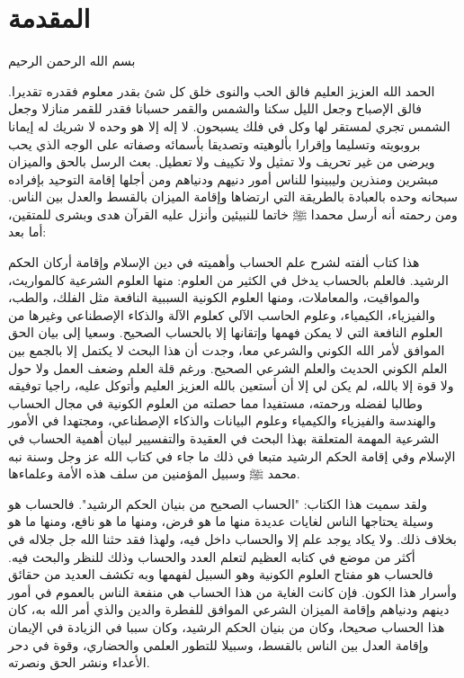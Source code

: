 \chapter*{المقدمة}

\begin{center}
    بسم الله الرحمن الرحيم
\end{center}

الحمد الله العزيز العليم فالق الحب والنوى خلق كل شئ بقدر معلوم فقدره تقديرا. فالق الإصباح وجعل الليل سكنا والشمس والقمر حسبانا فقدر للقمر منازلا وجعل الشمس تجري لمستقر لها وكل في فلك يسبحون. لا إله إلا هو وحده لا شريك له  إيمانا بروبويته وتسليما وإقرارا بألوهيته وتصديقا بأسمائه وصفاته على الوجه الذي يحب ويرضى من غير تحريف ولا تمثيل ولا تكييف ولا تعطيل. بعث الرسل بالحق والميزان مبشرين ومنذرين وليبينوا للناس أمور دنيهم ودنياهم ومن أجلها إقامة التوحيد بإفراده سبحانه وحده بالعبادة بالطريقة التي ارتضاها وإقامة الميزان بالقسط والعدل بين الناس. ومن رحمته أنه أرسل محمدا ﷺ خاتما للنبيئين وأنزل عليه القرآن هدى وبشرى للمتقين، أما بعد:

هذا كتاب ألفته لشرح علم الحساب وأهميته في دين الإسلام وإقامة أركان الحكم الرشيد. فالعلم بالحساب يدخل في الكثير من العلوم: منها العلوم الشرعية كالمواريث، والمواقيت، والمعاملات، ومنها العلوم الكونية السببية النافعة مثل الفلك، والطب، والفيزياء، الكيمياء، وعلوم الحاسب الآلي كعلوم الآلة والذكاء الإصطناعي وغيرها من العلوم النافعة التي لا يمكن فهمها وإتقانها إلا بالحساب الصحيح. وسعيا إلى بيان الحق الموافق لأمر الله الكوني والشرعي معا، وجدت أن هذا البحث لا يكتمل إلا بالجمع بين العلم الكوني الحديث والعلم الشرعي الصحيح. ورغم قلة العلم وضعف العمل ولا حول ولا قوة إلا بالله، لم يكن لي إلا أن أستعين بالله العزيز العليم وأتوكل عليه، راجيا توفيقه وطالبا لفضله ورحمته، مستفيدا مما حصلته من العلوم الكونية في مجال الحساب والهندسة والفيزياء والكيمياء وعلوم البيانات والذكاء الإصطناعي، ومجتهدا في الأمور الشرعية المهمة المتعلقة بهذا البحث في العقيدة والتفسيير لبيان أهمية الحساب في الإسلام وفي إقامة الحكم الرشيد متبعا في ذلك ما جاء في كتاب الله عز وجل وسنة نبه محمد ﷺ وسبيل المؤمنين من سلف هذه الأمة وعلماءها.

ولقد سميت هذا الكتاب: "الحساب الصحيح من بنيان الحكم الرشيد". فالحساب هو وسيلة يحتاجها الناس لغايات عديدة منها ما هو فرض، ومنها ما هو نافع، ومنها ما هو بخلاف ذلك. ولا يكاد يوجد علم إلا والحساب داخل فيه، ولهذا فقد حثنا الله جل جلاله في أكثر من موضع في كتابه العظيم لتعلم العدد والحساب وذلك للنظر والبحث فيه. فالحساب هو مفتاح العلوم الكونية وهو السبيل لفهمها وبه تكشف العديد من حقائق وأسرار هذا الكون. فإن كانت الغاية من هذا الحساب هي منفعة الناس بالعموم في أمور دينهم ودنياهم وإقامة الميزان الشرعي الموافق للفطرة والدين والذي أمر الله به، كان هذا الحساب صحيحا، وكان من بنيان الحكم الرشيد، وكان سببا في الزيادة في الإيمان وإقامة العدل بين الناس بالقسط، وسبيلا للتطور العلمي والحضاري، وقوة في دحر الأعداء ونشر الحق ونصرته. 

